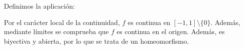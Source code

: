\begin{ejemplo}
\begin{enumerate}
\begin{figure}[H]
        \end{figure}

        Definimos la aplicación:

        Por el carácter local de la continuidad, $f$ es continua en $[-1,1]\setminus \{0\}$. Además, mediante límites se comprueba que $f$ es continua en el origen. Además, es biyectiva y abierta, por lo que se trata de un homeomorfismo.
        \begin{comment}
            TERMINAR
        \end{comment}
    \end{enumerate}
\end{ejemplo}
